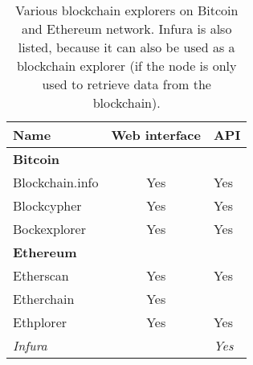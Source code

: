 \begin{table}[ht]
    \centering
    \begin{tabular}{|l c l|}
        \hline
        \textbf{Name}&\textbf{Web interface}&\textbf{API}\\
        \hline
        \multicolumn{3}{|l|}{\textbf{Bitcoin}}\\
        Blockchain.info&Yes&Yes\\
        Blockcypher&Yes&Yes\\
        Bockexplorer&Yes&Yes\\
        \hline
        \multicolumn{3}{|l|}{\textbf{Ethereum}}\\
        Etherscan&Yes&Yes\\
        Etherchain&Yes&\\
        Ethplorer&Yes&Yes\\
        \textit{Infura}&&\textit{Yes}\\
        \hline
    \end{tabular}
    \caption{Various blockchain explorers on Bitcoin and Ethereum network. Infura is also listed, because it can also be used as a blockchain explorer (if the node is only used to retrieve data from the blockchain).}
    \label{tab:block-explorers}
\end{table}

